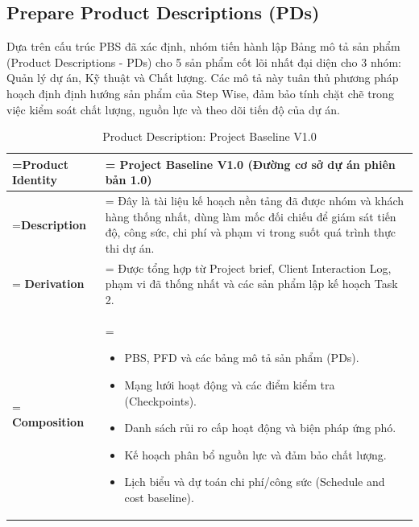 \subsection{Prepare Product Descriptions (PDs)}


Dựa trên cấu trúc PBS đã xác định, nhóm tiến hành lập Bảng mô tả sản phẩm (Product Descriptions - PDs) cho 5 sản phẩm cốt lõi nhất đại diện cho 3 nhóm: Quản lý dự án, Kỹ thuật và Chất lượng. Các mô tả này tuân thủ phương pháp hoạch định định hướng sản phẩm của Step Wise, đảm bảo tính chặt chẽ trong việc kiểm soát chất lượng, nguồn lực và theo dõi tiến độ của dự án.

\clearpage
\begin{table}[H]
    \centering
    \caption{Product Description: Project Baseline V1.0}
    \renewcommand{\arraystretch}{1.5}
    \begin{tabularx}{\textwidth}{|>{\hsize=0.5\hsize\linewidth=\hsize\bfseries}X|>{\hsize=1.5\hsize\linewidth=\hsize}X|}
        \hline
        Product Identity & \textbf{Project Baseline V1.0} (Đường cơ sở dự án phiên bản 1.0) \\
        \hline
        Description & Đây là tài liệu kế hoạch nền tảng đã được nhóm và khách hàng thống nhất, dùng làm mốc đối chiếu để giám sát tiến độ, công sức, chi phí và phạm vi trong suốt quá trình thực thi dự án. \\
        \hline
        Derivation & Được tổng hợp từ Project brief, Client Interaction Log, phạm vi đã thống nhất và các sản phẩm lập kế hoạch Task 2. \\
        \hline
        Composition & 
        \vspace{-0.8em}
        \begin{itemize}[leftmargin=*, nosep]
            \item PBS, PFD và các bảng mô tả sản phẩm (PDs).
            \item Mạng lưới hoạt động và các điểm kiểm tra (Checkpoints).
            \item Danh sách rủi ro cấp hoạt động và biện pháp ứng phó.
            \item Kế hoạch phân bổ nguồn lực và đảm bảo chất lượng.
            \item Lịch biểu và dự toán chi phí/công sức (Schedule and cost baseline).
        \end{itemize}
        \vspace{-1em} \\

\end{tabularx}
\end{table}
